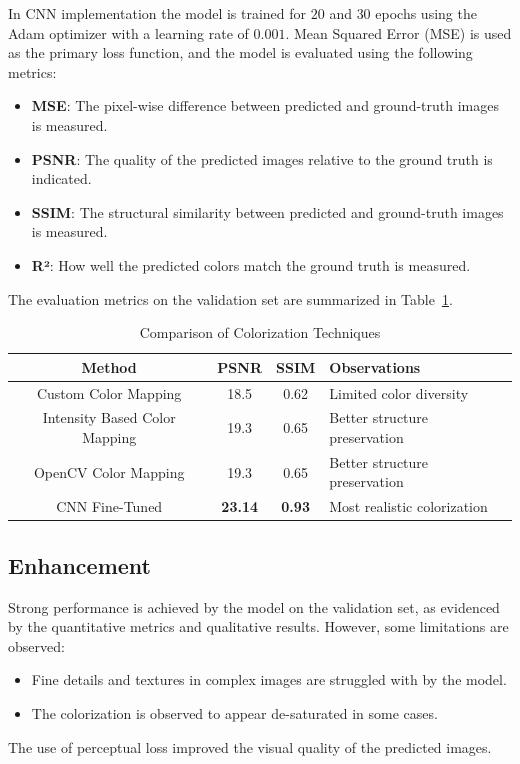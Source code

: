 \documentclass[conference]{IEEEtran}
\begin{document}
\begin{itemize}
In CNN implementation the model is trained for $20$ and $30$ epochs using the Adam optimizer with a learning rate of $0.001$. Mean Squared Error (MSE) is used as the primary loss function, and the model is evaluated using the following metrics:
\begin{itemize}
    \item \textbf{MSE}: The pixel-wise difference between predicted and ground-truth images is measured.
    \item \textbf{PSNR}: The quality of the predicted images relative to the ground truth is indicated.
    \item \textbf{SSIM}: The structural similarity between predicted and ground-truth images is measured.
    \item \textbf{R²}: How well the predicted colors match the ground truth is measured.
\end{itemize}
\end{itemize}
The evaluation metrics on the validation set are summarized in Table~\ref{table:metrics_results}.

\begin{table}[t]
\centering
\renewcommand{\arraystretch}{1.1} %
\setlength{\tabcolsep}{2pt} %
\begin{tabular}{|c|c|c|p{2.8cm}|}  %
\hline
\textbf{Method} & \textbf{PSNR} & \textbf{SSIM} & \textbf{Observations} \\ \hline
Custom Color Mapping & 18.5 & 0.62 & Limited color diversity \\ \hline
Intensity Based Color Mapping & 19.3 & 0.65 & Better structure preservation \\ \hline
OpenCV Color Mapping & 19.3 & 0.65 & Better structure preservation \\ \hline
CNN Fine-Tuned & \textbf{23.14} & \textbf{0.93} & Most realistic colorization \\ \hline
\end{tabular}
\caption{Comparison of Colorization Techniques}
\label{table:metrics_results}
\end{table}

\subsection{Enhancement}
Strong performance is achieved by the model on the validation set, as evidenced by the quantitative metrics and qualitative results. However, some limitations are observed:
\begin{itemize}
    \item Fine details and textures in complex images are struggled with by the model.
    \item The colorization is observed to appear de-saturated in some cases.
\end{itemize}
The use of perceptual loss improved the visual quality of the predicted images.
\end{document}
